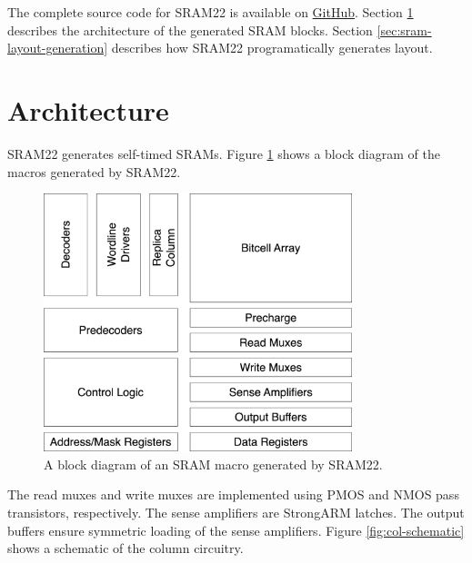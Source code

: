 The complete source code for SRAM22 is available on \href{https://github.com/rahulk29/sram22}{GitHub}.
Section \ref{sec:sram-architecture} describes the architecture of the generated SRAM blocks.
Section \ref{sec:sram-layout-generation} describes how SRAM22 programatically generates layout.

\section{Architecture} \label{sec:sram-architecture}

SRAM22 generates self-timed SRAMs. Figure \ref{fig:sram22-block-diagram} shows a block diagram
of the macros generated by SRAM22.

\begin{figure}[H] \centering
\includegraphics[width=0.8\textwidth]{figures/sram22_block_diagram.png}
\caption{A block diagram of an SRAM macro generated by SRAM22. \label{fig:sram22-block-diagram}}
\end{figure}

The read muxes and write muxes are implemented using PMOS and NMOS pass transistors, respectively.
The sense amplifiers are StrongARM latches. The output buffers ensure symmetric loading of the sense amplifiers.
Figure \ref{fig:col-schematic} shows a schematic of the column circuitry.

